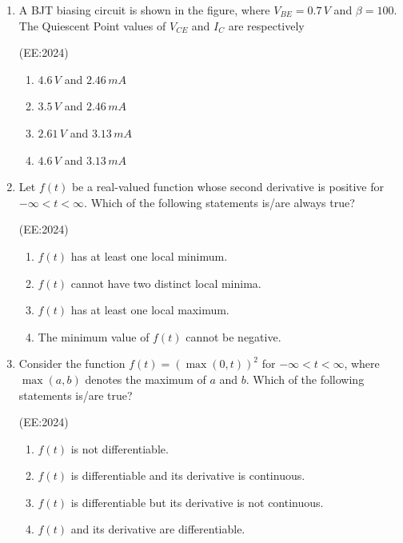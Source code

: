 \documentclass[journal,12pt,onecolumn]{IEEEtran}
\theoremstyle{remark}
\begin{document}
\begin{enumerate}
    \item A BJT biasing circuit is shown in the figure, where $V_{BE} = 0.7\, V$ and $\beta = 100$. The Quiescent Point values of $V_{CE}$ and $I_C$ are respectively 
	    
	   
	    \hfill{(EE:2024)}
		\begin{multicols}{2}
    \begin{enumerate}
        \item $4.6\, V$ and $2.46\, mA$
        \item $3.5\, V$ and $2.46\, mA$
        \item $2.61\, V$ and $3.13\, mA$
        \item $4.6\, V$ and $3.13\, mA$
    \end{enumerate}
			\end{multicols}

    \item Let $f(t)$ be a real-valued function whose second derivative is positive for $-\infty < t < \infty$. Which of the following statements is/are always true?
	  
	    \hfill{(EE:2024)}

    \begin{enumerate}
        \item $f(t)$ has at least one local minimum.
        \item $f(t)$ cannot have two distinct local minima.
        \item $f(t)$ has at least one local maximum.
        \item The minimum value of $f(t)$ cannot be negative.
    \end{enumerate}

    \item Consider the function $f(t) = (\max(0, t))^2$ for $-\infty < t < \infty$, where $\max(a, b)$ denotes the maximum of $a$ and $b$. Which of the following statements is/are true? 

	    \hfill{(EE:2024)}
    \begin{enumerate}
        \item $f(t)$ is not differentiable.
        \item $f(t)$ is differentiable and its derivative is continuous.
        \item $f(t)$ is differentiable but its derivative is not continuous.
        \item $f(t)$ and its derivative are differentiable.
    \end{enumerate}


\end{enumerate}
\end{document}
